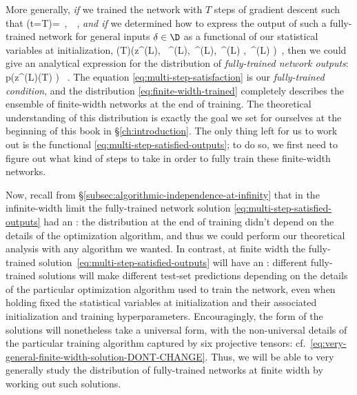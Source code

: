 More generally, \emph{if} we trained the network with $T$ steps of gradient descent such that
\be\label{eq:multi-step-satisfaction}
(t=T)=\, ,\qquad {}\ \tra\in\A\, ,
\ee
\emph{and if} we determined how to express the output of such a fully-trained network for general inputs $\delta\in\D$ as a functional of our statistical variables at initialization,
\be\label{eq:multi-step-satisfied-outputs}
(T)\equiv \le[\z{i}{\delta}{L}(t=T)\ri]\!\le(z^{(L)}, \, \NTK^{(L)},\, \dNTK^{(L)},\, \ddNTK^{(L)} , \,\ddNTKII^{(L)}  \ri)\, ,
\ee
then we could give an analytical expression for the distribution of \emph{fully-trained network outputs}:
\be\label{eq:finite-width-trained}
p\!\le(z^{(L)}(T) \ri) \, .
\ee
The equation \eqref{eq:multi-step-satisfaction} is our \emph{fully-trained condition}, and the distribution \eqref{eq:finite-width-trained} completely describes the ensemble of finite-width networks at the end of training. The theoretical understanding of this distribution is exactly the goal we set for ourselves at the beginning of this book in \S\ref{ch:introduction}.
The only thing left for us to work out is the functional \eqref{eq:multi-step-satisfied-outputs}; to do so, we first need to figure out what kind of steps to take in order to fully train these finite-width networks.

Now, recall from \S\ref{subsec:algorithmic-independence-at-infinity} that in the infinite-width limit the fully-trained network solution \eqref{eq:multi-step-satisfied-outputs} had an : the distribution at the end of training didn't depend on the details of the optimization algorithm, and thus we could perform our theoretical analysis with any algorithm we wanted. In contrast, at finite width the fully-trained solution~\eqref{eq:multi-step-satisfied-outputs} will have an : different fully-trained solutions will make different test-set predictions depending on the details of the particular optimization algorithm used to train the network, even when holding fixed the statistical variables at initialization and their associated initialization and training hyperparameters. Encouragingly, the form of the solutions will nonetheless take a universal form, with the non-universal details of the particular training algorithm captured by six projective tensors: cf.~\eqref{eq:very-general-finite-width-solution-DONT-CHANGE}. Thus, we will be able to very generally study the distribution of fully-trained networks at finite width by working out such solutions.


